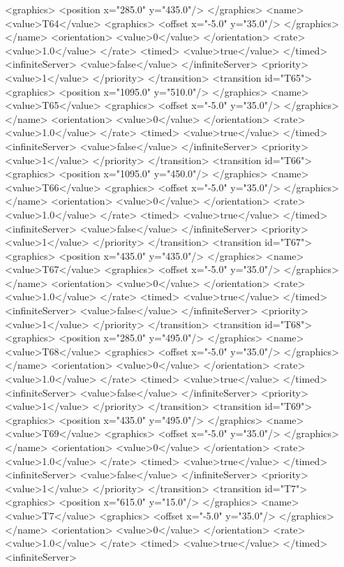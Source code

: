 <graphics>
<position x="285.0" y="435.0"/>
</graphics>
<name>
<value>T64</value>
<graphics>
<offset x="-5.0" y="35.0"/>
</graphics>
</name>
<orientation>
<value>0</value>
</orientation>
<rate>
<value>1.0</value>
</rate>
<timed>
<value>true</value>
</timed>
<infiniteServer>
<value>false</value>
</infiniteServer>
<priority>
<value>1</value>
</priority>
</transition>
<transition id="T65">
<graphics>
<position x="1095.0" y="510.0"/>
</graphics>
<name>
<value>T65</value>
<graphics>
<offset x="-5.0" y="35.0"/>
</graphics>
</name>
<orientation>
<value>0</value>
</orientation>
<rate>
<value>1.0</value>
</rate>
<timed>
<value>true</value>
</timed>
<infiniteServer>
<value>false</value>
</infiniteServer>
<priority>
<value>1</value>
</priority>
</transition>
<transition id="T66">
<graphics>
<position x="1095.0" y="450.0"/>
</graphics>
<name>
<value>T66</value>
<graphics>
<offset x="-5.0" y="35.0"/>
</graphics>
</name>
<orientation>
<value>0</value>
</orientation>
<rate>
<value>1.0</value>
</rate>
<timed>
<value>true</value>
</timed>
<infiniteServer>
<value>false</value>
</infiniteServer>
<priority>
<value>1</value>
</priority>
</transition>
<transition id="T67">
<graphics>
<position x="435.0" y="435.0"/>
</graphics>
<name>
<value>T67</value>
<graphics>
<offset x="-5.0" y="35.0"/>
</graphics>
</name>
<orientation>
<value>0</value>
</orientation>
<rate>
<value>1.0</value>
</rate>
<timed>
<value>true</value>
</timed>
<infiniteServer>
<value>false</value>
</infiniteServer>
<priority>
<value>1</value>
</priority>
</transition>
<transition id="T68">
<graphics>
<position x="285.0" y="495.0"/>
</graphics>
<name>
<value>T68</value>
<graphics>
<offset x="-5.0" y="35.0"/>
</graphics>
</name>
<orientation>
<value>0</value>
</orientation>
<rate>
<value>1.0</value>
</rate>
<timed>
<value>true</value>
</timed>
<infiniteServer>
<value>false</value>
</infiniteServer>
<priority>
<value>1</value>
</priority>
</transition>
<transition id="T69">
<graphics>
<position x="435.0" y="495.0"/>
</graphics>
<name>
<value>T69</value>
<graphics>
<offset x="-5.0" y="35.0"/>
</graphics>
</name>
<orientation>
<value>0</value>
</orientation>
<rate>
<value>1.0</value>
</rate>
<timed>
<value>true</value>
</timed>
<infiniteServer>
<value>false</value>
</infiniteServer>
<priority>
<value>1</value>
</priority>
</transition>
<transition id="T7">
<graphics>
<position x="615.0" y="15.0"/>
</graphics>
<name>
<value>T7</value>
<graphics>
<offset x="-5.0" y="35.0"/>
</graphics>
</name>
<orientation>
<value>0</value>
</orientation>
<rate>
<value>1.0</value>
</rate>
<timed>
<value>true</value>
</timed>
<infiniteServer>
